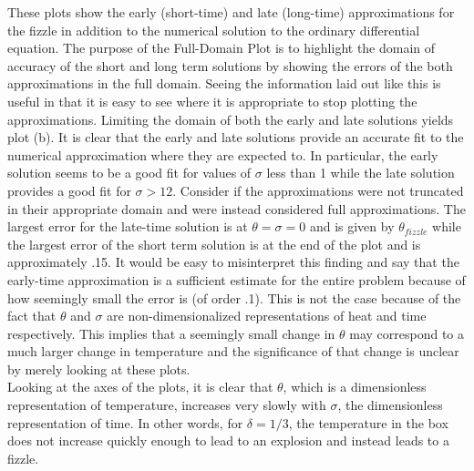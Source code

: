 \documentclass{article}
\begin{document}
\noindent These plots show the early (short-time) and late (long-time) approximations for the fizzle in addition to the numerical solution to the ordinary differential equation. The purpose of the Full-Domain Plot is to highlight the domain of accuracy of the short and long term solutions by showing the errors of the both approximations in the full domain.  Seeing the information laid out like this is useful in that it is easy to see where it is appropriate to stop plotting the approximations.  Limiting the domain of both the early and late solutions yields plot (b).  It is clear that the early and late solutions provide an accurate fit to the numerical approximation where they are expected to.  In particular, the early solution seems to be a good fit for values of $\sigma$ less than 1 while the late solution provides a good fit for $\sigma > 12$.   Consider if the approximations were not truncated in their appropriate domain and were instead considered full approximations.  The largest error for the late-time solution is at $\theta = \sigma = 0$ and is given by $\theta_{fizzle}$ while the largest error of the short term solution is at the end of the plot and is approximately .15.  It would be easy to misinterpret this finding and say that the early-time approximation is a sufficient estimate for the entire problem because of how seemingly small the error is (of order .1).  This is not the case because of the fact that $\theta$ and $\sigma$ are non-dimensionalized representations of heat and time respectively.  This implies that a seemingly small change in $\theta$ may correspond to a much larger change in temperature and the significance of that change is unclear by merely looking at these plots.\\\newline Looking at the axes of the plots, it is clear that $\theta$, which is a dimensionless representation of temperature, increases very slowly with $\sigma$, the dimensionless representation of time.  In other words, for $\delta = 1/3$, the temperature in the box does not increase quickly enough to lead to an explosion and instead leads to a fizzle. 
\end{document}
